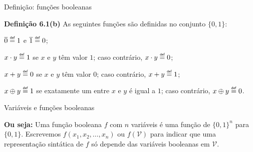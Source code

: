 \expandafter\documentclass\expandafter[table, usenames, svgnames, dvipsnames,14pt, \classopts]{beamer}
\newcommand\defeq{\mathrel{\overset{\makebox[0pt]{\mbox{\normalfont\tiny\sffamily def}}}{=}}}
\begin{document}
\begin{frame}{Definição: funções booleanas}

    \begin{block}{\textbf{Definição 6.1(b)}}
        As seguintes funções são definidas no conjunto $\{0,1\}$:
        \\
        \begin{outline}
            \1 $\overline{0} \defeq 1$ e $\overline{1} \defeq 0$;
                
            \1 $x \cdot y \defeq 1$ se $x$ e $y$ têm valor $1$; caso contrário, $x \cdot y \defeq 0$;
            
            \1 $x + y \defeq 0$ se $x$ e $y$ têm valor $0$; caso contrário, $x + y \defeq 1$;
            
            \1 $x \oplus y \defeq 1$ se exatamente um entre $x$ e $y$ é igual a $1$; caso contrário, $x \oplus y \defeq 0$.
        \end{outline}        
        
    \end{block}

\end{frame}

\begin{frame}{Variáveis e funções booleanas}

    \begin{block}{\textbf{Ou seja:}}
        Uma função booleana $f$ com $n$ variáveis é uma função de $\{0,1\}^n$ para $\{0,1\}$. Escrevemos $f(x_1,x_2,\dots,x_n)$ ou $f(\mathcal{V})$ para indicar que uma representação sintática de $f$ só depende das variáveis booleanas em $\mathcal{V}$.
    \end{block}

    \setlength{\fboxsep}{-5pt}
    \setlength{\parfillskip}{-5pt plus 0em}
    
\end{frame}
\end{document}
